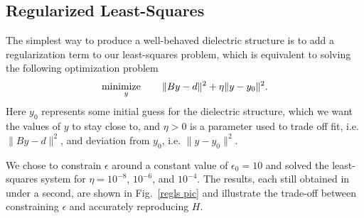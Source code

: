 \subsection{Regularized Least-Squares}
The simplest way to produce a well-behaved dielectric structure is to add a regularization term to our least-squares problem, 
which is equivalent to solving the following optimization problem
\begin{equation}
\operatorname*{\text{minimize}\quad}_{y}\quad \|By-d\|^2 + \eta\|y-y_0\|^2.
\label{regls alt} \end{equation}
Here $y_0$ represents some initial guess for the dielectric structure, which we want the values of $y$ to stay close to, and $\eta>0$ is a parameter used to trade off fit, i.e. $\|By-d\|^2$, and deviation from $y_0$, i.e. $\|y-y_0\|^2$.

We chose to constrain $\epsilon$ around a constant value of $\epsilon_0 = 10$ and solved the least-squares system for $\eta=10^{-8}$, $10^{-6}$, and $10^{-4}$. The results, each still obtained in under a second, are shown in Fig.~\ref{regls pic} and illustrate the trade-off between constraining $\epsilon$ and accurately reproducing $H$.

